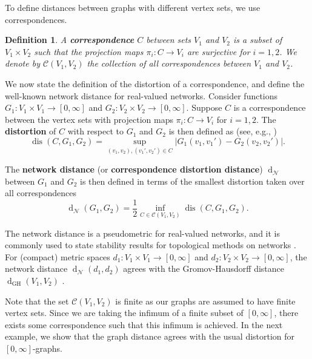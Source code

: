 \documentclass[a4paper,11pt]{article}
\newcounter{dummy}\numberwithin{dummy}{section}
\newtheorem{definition}[dummy]{Definition}
\theoremstyle{remark}
\begin{document}
To define distances between graphs with different vertex sets, we use correspondences.%

\begin{definition}
A \textbf{correspondence} $C$ between sets $V_1$ and $V_2$ is a subset of $V_1\times V_2$ such that the projection maps $\pi_i\colon C\to V_i$ are surjective for $i=1,2$. We denote by $\mathcal{C}(V_1,V_2)$ the collection of all correspondences between $V_1$ and $V_2$.
\end{definition}

We now state the definition of the distortion of a correspondence, and define the well-known network distance for real-valued networks. Consider functions $G_1\colon V_1\times V_1\to [0,\infty]$ and $G_2\colon V_2\times V_2\to [0,\infty]$. Suppose $C$ is a correspondence between the vertex sets with projection maps $\pi_i\colon C\to V_i$ for $i=1,2$. The \textbf{distortion} of $C$ with respect to $G_1$ and $G_2$ is then defined as (see, e.g., \cite{chowdhury2018functorial})
\begin{equation*}
    \operatorname{dis}(C,G_1,G_2) = \sup_{(v_1,v_2),(v_1',v_2')\in C}\vert G_1(v_1,v_1') - G_2(v_2, v_2')\vert.
\end{equation*}

The \textbf{network distance} (or \textbf{correspondence distortion distance}) $\operatorname{d}_{\mathcal{N}}$ between $G_1$ and $G_2$ is then defined in terms of the smallest distortion taken over all correspondences
\begin{equation*}
    \operatorname{d}_{\mathcal{N}}(G_1, G_2) = \frac{1}{2}\inf_{C\in\mathcal{C}(V_1, V_2)}\operatorname{dis}(C,G_1,G_2).
\end{equation*}

The network distance is a pseudometric for real-valued networks, and it is commonly used to state stability results for topological methods on networks \cite{chowdhury2018functorial, chowdhury2018persistent, mendez2023directed, turner2019rips, carlsson2014hierarchical}. For (compact) metric spaces $d_1:V_1\times V_1\to [0,\infty]$ and $d_2:V_2\times V_2\to [0,\infty]$, the network distance $\operatorname{d}_\mathcal{N}(d_1,d_2)$ agrees with the Gromov-Hausdorff distance $\operatorname{d}_{\textrm{GH}}(V_1,V_2)$ \cite[Theorem~7.3.25]{burago2022course}. 

Note that the set $\mathcal{C}(V_1,V_2)$ is finite as our graphs are assumed to have finite vertex sets. Since we are taking the infimum of a finite subset of $[0,\infty]$, there exists some correspondence such that this infimum is achieved. In the next example, we show that the graph distance agrees with the usual distortion for $[0,\infty]$-graphs.
\end{document}
